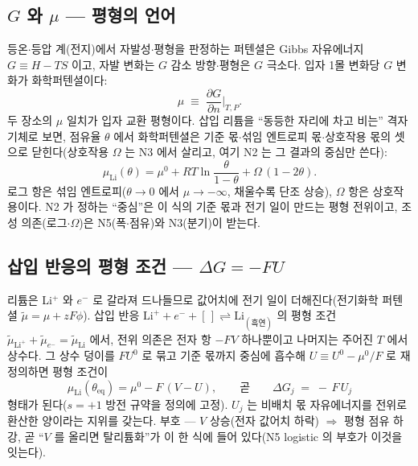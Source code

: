 \documentclass[11pt,a4paper]{article}
\newcommand{\eq}{\mathrm{eq}}
\begin{document}
\subsection{$G$ 와 $\mu$ — 평형의 언어}
등온$\cdot$등압 계(전지)에서 자발성$\cdot$평형을 판정하는 퍼텐셜은 Gibbs 자유에너지 $G\equiv H-TS$ 이고, 자발 변화는 $G$ 감소 방향$\cdot$평형은 $G$ 극소다. 입자 1몰 변화당 $G$ 변화가 화학퍼텐셜이다:
\begin{equation}
\mu\;\equiv\;\frac{\partial G}{\partial n}\Big|_{T,P}.
\label{eq:mudef}
\end{equation}
두 장소의 $\mu$ 일치가 입자 교환 평형이다. 삽입 리튬을 ``동등한 자리에 차고 비는'' 격자기체로 보면, 점유율 $\theta$ 에서 화학퍼텐셜은 기준 몫$\cdot$섞임 엔트로피 몫$\cdot$상호작용 몫의 셋으로 닫힌다(상호작용 $\Omega$ 는 N3 에서 살리고, 여기 N2 는 그 결과의 중심만 쓴다):
\begin{equation}
\mu_{\mathrm{Li}}(\theta)=\mu^0+RT\ln\frac{\theta}{1-\theta}+\Omega\,(1-2\theta).
\label{eq:mu}
\end{equation}
로그 항은 섞임 엔트로피($\theta\to0$ 에서 $\mu\to-\infty$, 채울수록 단조 상승), $\Omega$ 항은 상호작용이다. N2 가 정하는 ``중심''은 이 식의 기준 몫과 전기 일이 만드는 평형 전위이고, 조성 의존(로그$\cdot\Omega$)은 N5(폭$\cdot$점유)와 N3(분기)이 받는다.

\subsection{삽입 반응의 평형 조건 — $\Delta G=-FU$}
리튬은 Li$^+$ 와 $e^-$ 로 갈라져 드나들므로 값어치에 전기 일이 더해진다(전기화학 퍼텐셜 $\tilde\mu=\mu+zF\phi$). 삽입 반응 $\mathrm{Li}^++e^-+[\,]\rightleftharpoons\mathrm{Li}_{(\text{흑연})}$ 의 평형 조건 $\tilde\mu_{\mathrm{Li}^+}+\tilde\mu_{e^-}=\tilde\mu_{\mathrm{Li}}$ 에서, 전위 의존은 전자 항 $-FV$ 하나뿐이고 나머지는 주어진 $T$ 에서 상수다. 그 상수 덩이를 $FU^0$ 로 묶고 기준 몫까지 중심에 흡수해 $U\equiv U^0-\mu^0/F$ 로 재정의하면 평형 조건이
\begin{equation}
\mu_{\mathrm{Li}}(\theta_\eq)=\mu^0-F\,(V-U),
\qquad\text{곧}\qquad
\Delta G_j\;=\;-\,F\,U_j
\label{eq:eqcond}
\end{equation}
형태가 된다($s=+1$ 방전 규약을 정의에 고정). $U_j$ 는 비배치 몫 자유에너지를 전위로 환산한 양이라는 지위를 갖는다. 부호 — $V$ 상승(전자 값어치 하락) $\Rightarrow$ 평형 점유 하강, 곧 ``$V$ 를 올리면 탈리튬화''가 이 한 식에 들어 있다(N5 logistic 의 부호가 이것을 잇는다).
\end{document}
